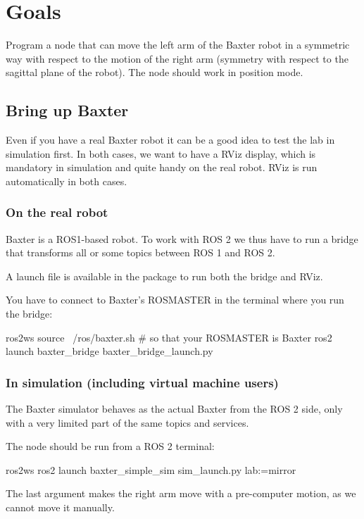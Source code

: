 \documentclass{ecnreport}
\author{O. Kermorgant}
\begin{document}


\section{Goals}

Program a node that can move the left arm of the Baxter robot in a symmetric way with respect to
the motion of the right arm (symmetry with respect to the sagittal plane of the robot).
The node should work in position mode. \\

\subsection{Bring up Baxter}

Even if you have a real Baxter robot it can be a good idea to test the lab in simulation first.
In both cases, we want to have a RViz display, which is mandatory in simulation and quite handy on the real robot. RViz is run automatically in both cases.

\subsubsection{On the real robot}

Baxter is a ROS1-based robot. To work with ROS 2 we thus have to run a bridge that transforms all or some topics between ROS 1 and ROS 2.

A launch file is available in the  package to run both the bridge and RViz.

You have to connect to Baxter's ROSMASTER in the terminal where you run the bridge:
\begin{bashcodelarge}
 ros2ws
 source ~/ros/baxter.sh # so that your ROSMASTER is Baxter
 ros2 launch baxter_bridge baxter_bridge_launch.py
\end{bashcodelarge}

\subsubsection{In simulation (including virtual machine users)}

The Baxter simulator behaves as the actual Baxter from the ROS 2 side, only with a very limited part of the same topics and services. 

The  node should be run from a ROS 2 terminal:
\begin{bashcodelarge}
ros2ws
ros2 launch baxter_simple_sim sim_launch.py lab:=mirror
\end{bashcodelarge}
The last argument makes the right arm move with a pre-computer motion, as we cannot move it manually.
\end{document}
